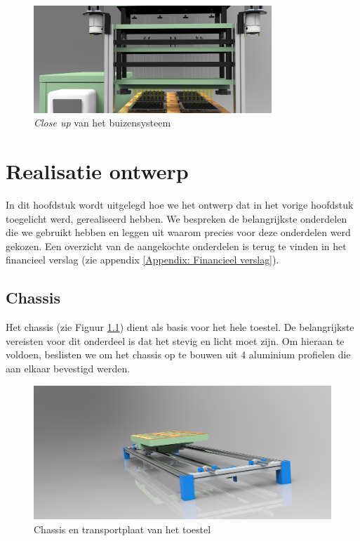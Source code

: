 \documentclass[a4paper,twoside,kulak]{kulakreport} %
\begin{document}
\begin{figure}[h]
	\centering
	\includegraphics[width=0.8\textwidth]{renderingBuizensysteem.jpg}
	\caption{\textit{Close up} van het buizensysteem}
	\label{fig: close up buizensysteem}
	
\end{figure} 


\chapter{Realisatie ontwerp}

In dit hoofdstuk wordt uitgelegd hoe we het ontwerp dat in het vorige hoofdstuk toegelicht werd, gerealiseerd hebben. We bespreken de belangrijkste onderdelen die we gebruikt hebben en leggen uit waarom precies voor deze onderdelen werd gekozen. Een overzicht van de aangekochte onderdelen is terug te vinden in het financieel verslag (zie appendix \ref{Appendix: Financieel verslag}).

\section{Chassis}

Het chassis (zie Figuur \ref{fig: chassis en transportplaat}) dient als basis voor het hele toestel. De belangrijkste vereisten voor dit onderdeel is dat het stevig en licht moet zijn. Om hieraan te voldoen, beslisten we om het chassis op te bouwen uit 4 aluminium profielen die aan elkaar bevestigd werden. 

\begin{figure}
	\centering
	\includegraphics[width=1\textwidth]{chassis+transportplaat.jpg}
	\caption{Chassis en transportplaat van het toestel}
	\label{fig: chassis en transportplaat}
	
\end{figure} 
\end{document}
